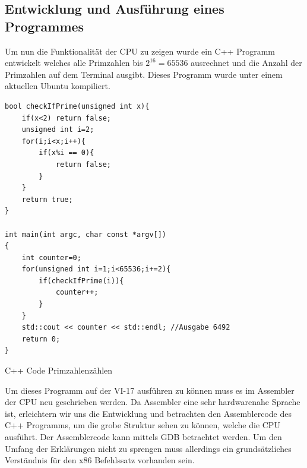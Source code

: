 \documentclass[12pt]{article}
\begin{document}
\newpage
\subsection{Entwicklung und Ausführung eines Programmes}


Um nun die Funktionalität der CPU zu zeigen wurde ein C++ Programm entwickelt welches alle Primzahlen bis $2^{16} = 65536$ ausrechnet und die Anzahl der Primzahlen auf dem Terminal ausgibt. Dieses Programm wurde unter einem aktuellen Ubuntu kompiliert.

\begin{code}[!htb]
\begin{lstlisting}
bool checkIfPrime(unsigned int x){
	if(x<2) return false;
	unsigned int i=2;
	for(i;i<x;i++){
		if(x%i == 0){
			return false;
		}
	}
	return true;
}

int main(int argc, char const *argv[])
{
	int counter=0;
	for(unsigned int i=1;i<65536;i+=2){
		if(checkIfPrime(i)){
			counter++;
		}
	}
	std::cout << counter << std::endl; //Ausgabe 6492
	return 0;
}
\end{lstlisting}
\caption[C++ Code Primzahlenzählen]{C++ Code Primzahlenzählen}
\end{code}



Um dieses Programm auf der VI-17 ausführen zu können muss es im Assembler der CPU neu geschrieben werden. Da Assembler eine sehr hardwarenahe Sprache ist, erleichtern wir uns die Entwicklung und betrachten den Assemblercode des C++ Programms, um die grobe Struktur sehen zu können, welche die CPU ausführt. Der Assemblercode kann mittels GDB betrachtet werden. Um den Umfang der Erklärungen nicht zu sprengen muss allerdings ein grundsätzliches Verständnis für den x86 Befehlssatz vorhanden sein.
\newpage
\end{document}
